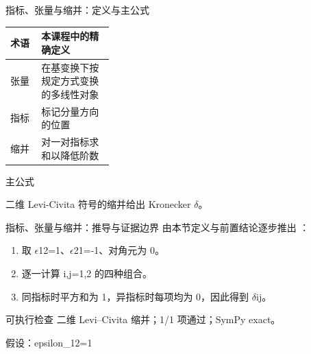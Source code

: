 \begin{frame}[t]{指标、张量与缩并：定义与主公式}
\footnotesize\begin{tabularx}{\linewidth}{p{0.30\linewidth}Y}
\toprule 术语 & 本课程中的精确定义\\\midrule
{} 张量 & 在基变换下按规定方式变换的多线性对象\\
 指标 & 标记分量方向的位置\\
 缩并 & 对一对指标求和以降低阶数\\
\bottomrule\end{tabularx}\vspace{0.15cm}
\begin{block}{ 主公式}\centering{}\end{block}
二维 Levi-Civita 符号的缩并给出 Kronecker \ensuremath{\delta}。
\end{frame}

\begin{frame}[t]{指标、张量与缩并：推导与证据边界}
\footnotesize
{}\quad 由本节定义与前置结论逐步推出 ：
\begin{enumerate}
\item 取 \ensuremath{\epsilon}12=1、\ensuremath{\epsilon}21=-1、对角元为 0。
\item 逐一计算 i,j=1,2 的四种组合。
\item 同指标时平方和为 1，异指标时每项均为 0，因此得到 \ensuremath{\delta}ij。
\end{enumerate}\begin{block}{可执行检查}
\quad 二维 Levi--Civita 缩并；1/1 项通过；SymPy exact。
\par\scriptsize 假设：epsilon\_12=1
\end{block}
\end{frame}


